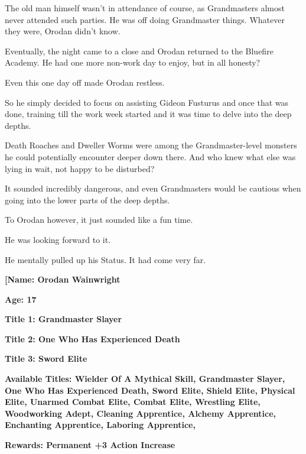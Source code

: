 \documentclass[a4paper,10pt]{book}
\begin{document}
The old man himself wasn’t in attendance of course, as Grandmasters almost never attended such parties. He was off doing Grandmaster things. Whatever they were, Orodan didn’t know.\par
Eventually, the night came to a close and Orodan returned to the Bluefire Academy. He had one more non-work day to enjoy, but in all honesty?\par
Even this one day off made Orodan restless.\par
So he simply decided to focus on assisting Gideon Fusturus and once that was done, training till the work week started and it was time to delve into the deep depths.\par
Death Roaches and Dweller Worms were among the Grandmaster-level monsters he could potentially encounter deeper down there. And who knew what else was lying in wait, not happy to be disturbed?\par
It sounded incredibly dangerous, and even Grandmasters would be cautious when going into the lower parts of the deep depths.\par
To Orodan however, it just sounded like a fun time.\par
He was looking forward to it.\par
He mentally pulled up his Status. It had come very far.\par
\textbf{[Name: Orodan Wainwright}\par
\textbf{Age: 17}\par
\textbf{Title 1: Grandmaster Slayer}\par
\textbf{Title 2: One Who Has Experienced Death}\par
\textbf{Title 3: Sword Elite}\par
\textbf{Available Titles: Wielder Of A Mythical Skill, Grandmaster Slayer, One Who Has Experienced Death, Sword Elite, Shield Elite, Physical Elite, Unarmed Combat Elite, Combat Elite, Wrestling Elite, Woodworking Adept, Cleaning Apprentice, Alchemy Apprentice, Enchanting Apprentice, Laboring Apprentice,}\par
\textbf{Rewards: Permanent +3 Action Increase}\par
\end{document}
